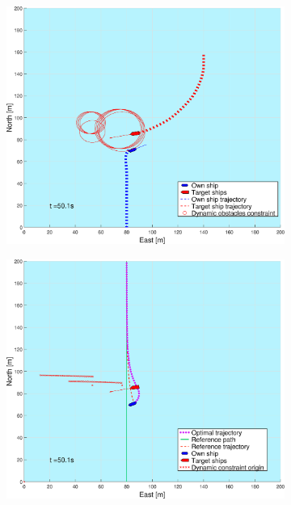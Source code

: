 \begin{figure}[ht!]
\begin{subfigure}[b]{0.494\textwidth}
        \subcaption{}
    \end{subfigure}
    \hfill
    \\
    \begin{subfigure}[b]{0.494\textwidth}
        \centering
        \includegraphics[width=\textwidth]{Images/Figures/sving_GW/_Simple_0fig1_time=50}
        \subcaption{}
    \end{subfigure}
    \hfill
    \begin{subfigure}[b]{0.494\textwidth}
        \centering
        \includegraphics[width=\textwidth]{Images/Figures/sving_GW/_Simple_0fig999_time=50}

\end{subfigure}
\end{figure}
